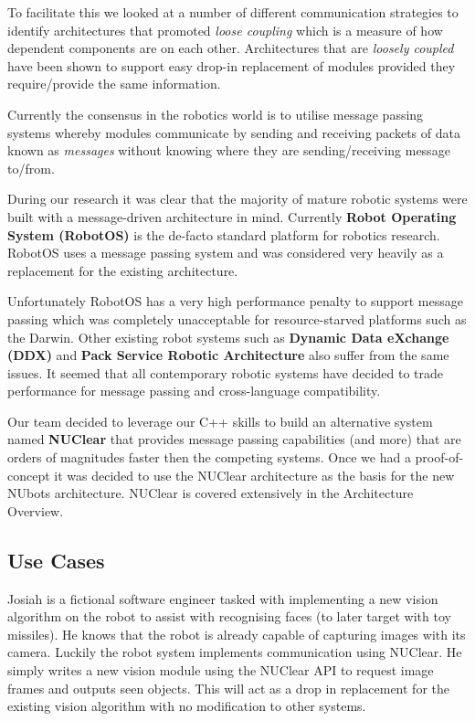 \documentclass[english,12pt]{scrartcl}
\begin{document}
				To facilitate this we looked at a number of different communication strategies to identify architectures that promoted \emph{loose coupling} which is a measure of how dependent components are on each other. 
				Architectures that are \emph{loosely coupled} have been shown to support easy drop-in replacement of modules provided they require/provide the same information.
				 
				Currently the consensus in the robotics world is to utilise message passing systems whereby modules communicate by sending and receiving packets of data known as \emph{messages} without knowing where they are sending/receiving message to/from.
				
				During our research it was clear that the majority of mature robotic systems were built with a message-driven architecture in mind. 
				Currently \textbf{Robot Operating System (RobotOS)} is the de-facto standard platform for robotics research.
				RobotOS uses a message passing system and was considered very heavily as a replacement for the existing architecture.
				
				Unfortunately RobotOS has a very high performance penalty to support message passing which was completely unacceptable for resource-starved platforms such as the Darwin. 
				Other existing robot systems such as \textbf{Dynamic Data eXchange (DDX)} and \textbf{Pack Service Robotic Architecture} also suffer from the same issues. It seemed that all contemporary robotic systems have decided to trade performance for message passing and cross-language compatibility.
				
				Our team decided to leverage our C++ skills to build an alternative system named \textbf{NUClear} that provides message passing capabilities (and more) that are orders of magnitudes faster then the competing systems. 
				Once we had a proof-of-concept it was decided to use the NUClear architecture as the basis for the new NUbots architecture. NUClear is covered extensively in the Architecture Overview.
				
				
		\subsection{Use Cases}
			Josiah is a fictional software engineer tasked with implementing a new vision algorithm on the robot to assist with recognising faces (to later target with toy missiles).
			He knows that the robot is already capable of capturing images with its camera.
			Luckily the robot system implements communication using NUClear. 
			He simply writes a new vision module using the NUClear API to request image frames and outputs seen objects.
			This will act as a drop in replacement for the existing vision algorithm with no modification to other systems.
			
\end{document}
